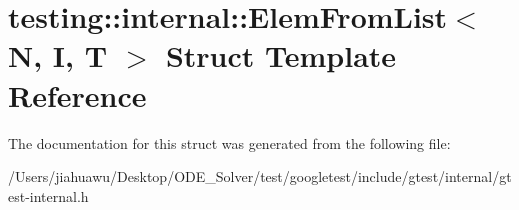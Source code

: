 \hypertarget{structtesting_1_1internal_1_1_elem_from_list}{}\section{testing\+:\+:internal\+:\+:Elem\+From\+List$<$ N, I, T $>$ Struct Template Reference}
\label{structtesting_1_1internal_1_1_elem_from_list}


The documentation for this struct was generated from the following file\+:\begin{DoxyCompactItemize}
\item 
/\+Users/jiahuawu/\+Desktop/\+O\+D\+E\+\_\+\+Solver/test/googletest/include/gtest/internal/gtest-\/internal.\+h\end{DoxyCompactItemize}
